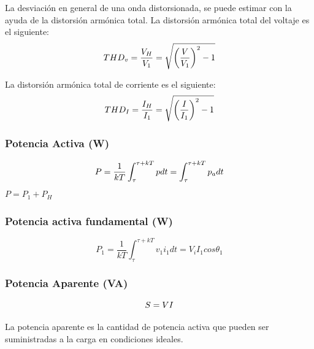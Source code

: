 La desviación en general de una onda distorsionada, se puede estimar con la ayuda de la distorsión armónica total. La distorsión armónica total del voltaje es el siguiente:\\

\begin{equation}\label{EQ23}
THD_{v}=\frac{V_{H}}{V_{1}}=\sqrt{\left(\frac{V}{V_{1}}\right)^2-1}\\
\end{equation}

La distorsión armónica total de corriente es el siguiente:\\
\begin{equation}\label{EQ24}
THD_{I}=\frac{I_{H}}{I_{1}}=\sqrt{\left(\frac{I}{I_{1}}\right)^2-1}\\
\end{equation}

\subsubsection{Potencia Activa (W)}

\begin{equation}\label{EQ25}
P=\frac{1}{kT}\int_{\tau}^{\tau + kT}pdt=\int_{\tau}^{\tau + kT}p_{a}dt\\
\end{equation}
$P=P_{1}+P_{H}$\\

\subsubsection{Potencia activa fundamental (W)}


\begin{equation}\label{EQ26}
P_{1}=\frac{1}{kT}\int_{\tau}^{\tau + kT}v_{1}i_{1}dt=V_{i}I_{1}cos \theta_{1}
\end{equation}

\subsubsection{Potencia Aparente (VA)}

\begin{equation}\label{EQ27}
S=VI\\
\end{equation}

La potencia aparente es la cantidad de potencia activa que pueden ser suministradas a la carga en condiciones ideales.\cite{A30}\\

